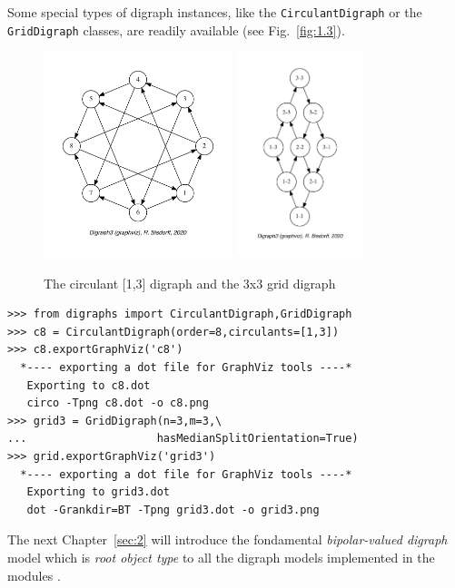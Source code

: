 Some special types of digraph instances, like the \texttt{CirculantDigraph} or the \texttt{GridDigraph} classes, are readily available (see Fig.~\vref{fig:1.3}).
 \begin{figure}[ht]
  \includegraphics[height=6cm]{Figures/1-3-c8.pdf} \hfill
  \includegraphics[height=6cm]{Figures/1-3-grid3.pdf} \hfill
  \caption{The circulant [1,3] digraph and the 3x3 grid digraph}
\label{fig:1.3}       %
\end{figure}
\begin{lstlisting}[caption={Circulant digraphs and $n \times m$ grid digraphs},label=list:1.7]
>>> from digraphs import CirculantDigraph,GridDigraph
>>> c8 = CirculantDigraph(order=8,circulants=[1,3])
>>> c8.exportGraphViz('c8')
  *---- exporting a dot file for GraphViz tools ----*
   Exporting to c8.dot
   circo -Tpng c8.dot -o c8.png
>>> grid3 = GridDigraph(n=3,m=3,\
...                    hasMedianSplitOrientation=True)
>>> grid.exportGraphViz('grid3')
  *---- exporting a dot file for GraphViz tools ----*
   Exporting to grid3.dot
   dot -Grankdir=BT -Tpng grid3.dot -o grid3.png
 \end{lstlisting}

\vspace{1cm}
The next Chapter~\ref{sec:2} will introduce the fondamental \emph{bipolar-valued digraph} model which is \emph{root object type} to all the digraph models implemented in the \Digraph modules \citep{BIS-2021b}.    



%